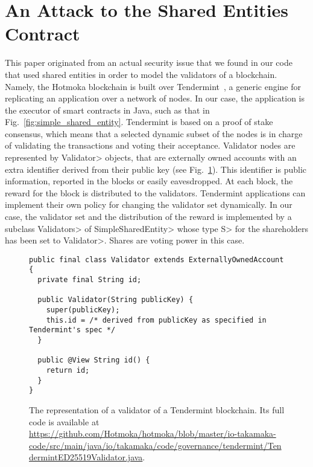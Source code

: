 \section{An Attack to the Shared Entities Contract}\label{sec:attack}

This paper originated from an actual security issue that we found in our code
that used shared entities in order to model the validators of a blockchain.
Namely, the Hotmoka blockchain is built over Tendermint~\cite{Kwon14}, a
generic engine for replicating an application over a network of nodes. In our case,
the application is the executor of smart contracts in Java, such as that in
Fig.~\ref{fig:simple_shared_entity}. Tendermint is based on a proof of stake
consensus, which means that a selected dynamic subset of the nodes is in charge of
validating the transactions and voting their acceptance. Validator nodes are
represented by \<Validator> objects, that are externally owned accounts
with an extra identifier derived from their public key (see Fig.~\ref{fig:validator}).
This identifier is public information, reported in the blocks or easily eavesdropped.
At each block, the reward for the block is distributed to the validators.
Tendermint applications can implement their own
policy for changing the validator set dynamically. In our case, the validator set
and the distribution of the reward is implemented by a subclass
\<Validators> of \<SimpleSharedEntity> whose type \<S> for the shareholders
has been set to \<Validator>. Shares are voting power in this case.

\begin{figure}[t]
  \begin{center}
    \begin{lstlisting}[language=Takamaka]
public final class Validator extends ExternallyOwnedAccount {
  private final String id;

  public Validator(String publicKey) {
    super(publicKey);
    this.id = /* derived from publicKey as specified in Tendermint's spec */
  }

  public @View String id() {
    return id;
  }
}
    \end{lstlisting}
  \end{center}
  \caption{The representation of a validator of a Tendermint blockchain.
  Its full code is available at \url{https://github.com/Hotmoka/hotmoka/blob/master/io-takamaka-code/src/main/java/io/takamaka/code/governance/tendermint/TendermintED25519Validator.java}.}\label{fig:validator}
\end{figure}

